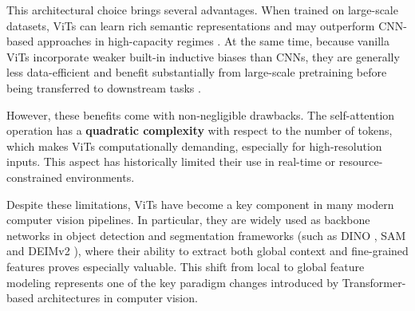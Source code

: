 This architectural choice brings several advantages. When trained on large-scale datasets, ViTs can learn rich semantic representations and may outperform CNN-based approaches in high-capacity regimes \cite{dosovitskiy_image_2021}. At the same time, because vanilla ViTs incorporate weaker built-in inductive biases than CNNs, they are generally less data-efficient and benefit substantially from large-scale pretraining before being transferred to downstream tasks \cite{dosovitskiy_image_2021}.

However, these benefits come with non-negligible drawbacks. The self-attention operation has a \textbf{quadratic complexity} with respect to the number of tokens, which makes ViTs computationally demanding, especially for high-resolution inputs. This aspect has historically limited their use in real-time or resource-constrained environments.

Despite these limitations, ViTs have become a key component in many modern computer vision pipelines. In particular, they are widely used as backbone networks in object detection and segmentation frameworks (such as DINO \cite{oquab_dinov2_2024}, SAM \cite{kirillov_segment_2023} and DEIMv2 \cite{huang_real-time_2026}), where their ability to extract both global context and fine-grained features proves especially valuable.
This shift from local to global feature modeling represents one of the key paradigm changes introduced by Transformer-based architectures in computer vision.
